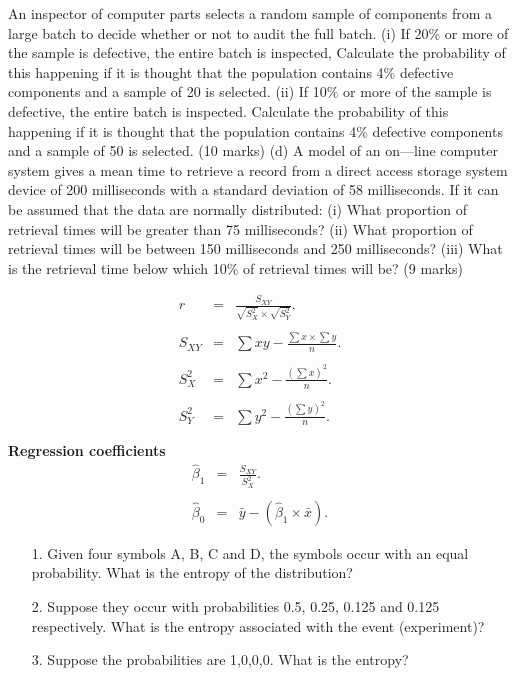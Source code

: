 \bigskip
An inspector of computer parts selects a random sample of components
from a large batch to decide whether or not to audit the full batch.
(i) If 20$\%$ or more of the sample is defective, the entire batch is
inspected, Calculate the probability of this happening if it is
thought that the population contains 4$\%$ defective components and
a sample of 20 is selected.
(ii) If 10$\%$ or more of the sample is defective, the entire batch is
inspected. Calculate the probability of this happening if it is
thought that the population contains 4$\%$ defective components and
a sample of 50 is selected.
(10 marks)
(d) A model of an on—line computer system gives a mean time to retrieve a
record from a direct access storage system device of 200 milliseconds
with a standard deviation of 58 milliseconds. If it can be assumed that
the data are normally distributed:
(i) What proportion of retrieval times will be greater than 75
milliseconds?
(ii) What proportion of retrieval times will be between 150
milliseconds and 250 milliseconds?
(iii) What is the retrieval time below which 10\% of retrieval times
will be?
(9 marks)


\begin{eqnarray*}
	r&=&\frac{S_{XY}}{\sqrt{S^2_X}\times\sqrt{S^2_Y}}.\\\\
	S_{XY}&=&\sum xy-\frac{\sum x \times \sum y}{n}.\\\\ S^2_X&=&\sum x^2-\frac{(\sum x)^2 }{n}.\\\\ S^2_Y&=&\sum y^2-\frac{(\sum y)^2 }{n}.\\\\ \end{eqnarray*} {\bf Regression coefficients} \begin{eqnarray*} \hat{\beta}_1&=&\frac{S_{XY}}{S^2_X}.\\\\
	\hat{\beta}_0&=&\bar{y}-(\hat{\beta}_1\times\bar{x}).
\end{eqnarray*}


\begin{itemize}
	\item[1.] Given four symbols A, B, C and D, the symbols occur with an equal
	probability. What is the entropy of the distribution?
	\item[2.] Suppose they occur with probabilities 0.5, 0.25, 0.125 and 0.125
	respectively. What is the entropy associated with the event (experiment)?
	\item[3.] Suppose the probabilities are 1,0,0,0. What is the entropy?
\end{itemize}

